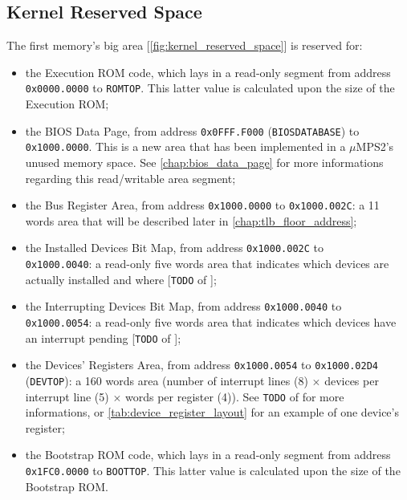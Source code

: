 \documentclass[12pt,a4paper,openright,twoside]{report}
\begin{document}
\subsection{Kernel Reserved Space}
\label{chap:kernel_reserved_space}
The first memory's big area [\autoref{fig:kernel_reserved_space}] is reserved for:
\begin{itemize}
	\item the Execution ROM code, which lays in a read-only segment from address \texttt{0x0000.0000} to \texttt{ROMTOP}. This latter value is calculated upon the size of the Execution ROM;
	\item the BIOS Data Page, from address \texttt{0x0FFF.F000} (\texttt{BIOSDATABASE}) to \texttt{0x1000.0000}. This is a new area that has been implemented in a $\mu$MPS2's unused memory space.
	      See \autoref{chap:bios_data_page} for more informations regarding this read/writable area segment;
	\item the Bus Register Area, from address \texttt{0x1000.0000} to \texttt{0x1000.002C}: a 11 words area that will be described later in \autoref{chap:tlb_floor_address};
	\item the Installed Devices Bit Map, from address \texttt{0x1000.002C} to \\ \texttt{0x1000.0040}: a read-only five words area that indicates which devices are actually installed and where [\texttt{TODO} of \cite{pops}];
	\item the Interrupting Devices Bit Map, from address \texttt{0x1000.0040} to \\ \texttt{0x1000.0054}: a read-only five words area that indicates which devices have an interrupt pending [\texttt{TODO} of \cite{pops}];
	\item the Devices' Registers Area, from address \texttt{0x1000.0054} to \texttt{0x1000.02D4} (\texttt{DEVTOP}): a 160 words area (number of interrupt lines (8) $\times$ devices per interrupt line (5) $\times$  words per register (4)). See \texttt{TODO} of \cite{pops} for more informations, or \autoref{tab:device_register_layout} for an example of one device's register;
	\item the Bootstrap ROM code, which lays in a read-only segment from address \texttt{0x1FC0.0000} to \texttt{BOOTTOP}. This latter value is calculated upon the size of the Bootstrap ROM.
\end{itemize}
\end{document}
